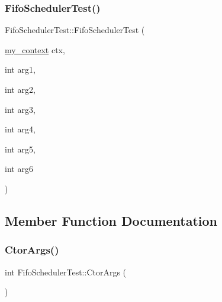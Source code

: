 \mbox{\label{struct_fifo_scheduler_test_ae33100bd4bdb46289ade20447edaf6c3}} 
\subsubsection{\texorpdfstring{Fifo\+Scheduler\+Test()}{FifoSchedulerTest()}\hspace{0.1cm}{\footnotesize\ttfamily [7/7]}}
{\footnotesize\ttfamily Fifo\+Scheduler\+Test\+::\+Fifo\+Scheduler\+Test (\begin{DoxyParamCaption}\item[{\mbox{\hyperlink{classboost_1_1statechart_1_1event__processor_a99f1c6ec8419ec82f140c5c93c5eb8cd}{my\+\_\+context}}}]{ctx,  }\item[{int}]{arg1,  }\item[{int}]{arg2,  }\item[{int}]{arg3,  }\item[{int}]{arg4,  }\item[{int}]{arg5,  }\item[{int}]{arg6 }\end{DoxyParamCaption})\hspace{0.3cm}{\ttfamily [inline]}}



\subsection{Member Function Documentation}
\mbox{\label{struct_fifo_scheduler_test_a70f4d02cb06c1d52be2138a0b5a40767}} 
\subsubsection{\texorpdfstring{Ctor\+Args()}{CtorArgs()}}
{\footnotesize\ttfamily int Fifo\+Scheduler\+Test\+::\+Ctor\+Args (\begin{DoxyParamCaption}{ }\end{DoxyParamCaption})\hspace{0.3cm}{\ttfamily [inline]}}



